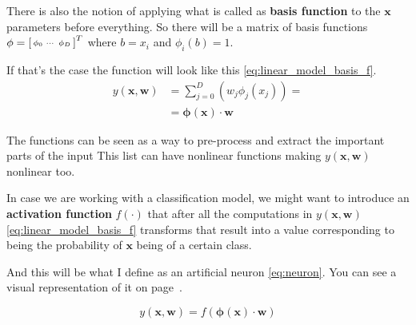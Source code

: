 \documentclass[a4paper,12pt]{article}
\theoremstyle{mytheoremstyle}
\theoremstyle{mytheoremstyle}
\theoremstyle{myproblemstyle}
\begin{document}
    There is also the notion of applying what is called as \textbf{basis
    function} to the $ \mathbf{x} $ parameters before everything. So there will
    be a matrix of basis functions $ \mathbf{\phi} =
    \begin{bsmallmatrix}\phi_{0}&\cdots&\phi_{D}\end{bsmallmatrix}^{T} $ where
    $ b = x_{i} $ and $ \phi_{i}(b) = 1 $.

    If that's the case the function will look like this
    \eqref{eq:linear_model_basis_f}.
    \begin{equation}
        \begin{split}
            y(\mathbf{x}, \mathbf{w}) & =
            \displaystyle\sum_{j=0}^{D}\left(w_{j}\phi_{j}(x_{j})\right) = \\
            & = \mathbf{\phi}\left(\mathbf{x}\right)\cdot\mathbf{w}
        \end{split}
        \label{eq:linear_model_basis_f}
    \end{equation}

    The functions can be seen as a way to pre-process and extract the important
    parts of the input This list can have nonlinear functions making $
    y(\mathbf{x}, \mathbf{w}) $ nonlinear too.

    In case we are working with a classification model, we might want to
    introduce an \textbf{activation function} $ f\left(\cdot\right) $ that
    after all the computations in $ y(\mathbf{x}, \mathbf{w}) $
    \eqref{eq:linear_model_basis_f} transforms that result into a value
    corresponding to being the probability of $ \mathbf{x} $ being of a certain
    class.

    And this will be what I define as an artificial neuron \eqref{eq:neuron}.
    You can see a visual representation of it on page~\pageref{fig:neuron}.

    \begin{equation}
        y(\mathbf{x}, \mathbf{w}) = f \left( \mathbf{\phi} \left( \mathbf{x}
        \right) \cdot\mathbf{w} \right)
        \label{eq:neuron}
    \end{equation}
\end{document}
